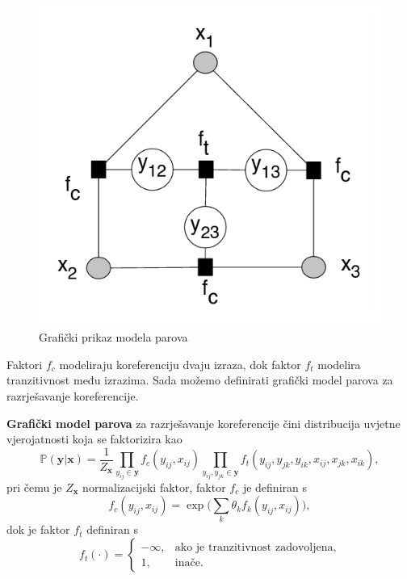 \documentclass[a4paper,twoside,12pt]{memoir} %
\newcommand{\tb}{\textbf}
\begin{document}
	\begin{figure}[H]
		\centering
		\includegraphics[scale = 0.5]{pairwise_factor_graph.png}
		\caption{Grafički prikaz modela parova}
	\end{figure}

	Faktori $f_c$ modeliraju koreferenciju dvaju izraza, dok faktor $f_t$ modelira tranzitivnost među izrazima. Sada možemo definirati grafički model parova za razrješavanje koreferencije.

	\begin{defn}
		\tb{Grafički model parova} za razrješavanje koreferencije čini distribucija uvjetne vjerojatnosti koja se faktorizira kao
		\begin{equation}\label{pairwise_graph}
		\mathbb{P}(\mathbf{y}| \mathbf{x}) =
		\frac{1}{Z_\mathbf{x}}
		\prod_{y_{ij} \in \mathbf{y}} f_c(y_{ij}, x_{ij})
		\prod_{y_{ij}, y_{jk} \in \mathbf{y}} f_t(y_{ij}, y_{jk}, y_{ik}, x_{ij}, x_{jk}, x_{ik}),
		\end{equation}
		pri čemu je ${Z_\mathbf{x}}$ normalizacijski faktor, faktor $f_c$ je definiran s
		\begin{equation*}
		f_c(y_{ij}, x_{ij}) = \exp\bigg(\sum\limits_{k} \theta_k f_k(y_{ij}, x_{ij})\bigg),
		\end{equation*}
		dok je faktor $f_t$ definiran s
		\begin{equation*}
		f_t(\cdot) =
		\begin{cases}
		-\infty, 		& \text{ako je tranzitivnost zadovoljena}, \\
		1,              & \text{inače}.
		\end{cases}
		\end{equation*}
	\end{defn}
\end{document}
